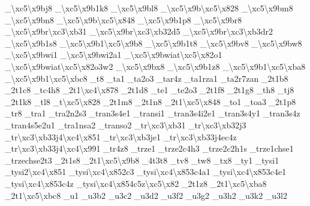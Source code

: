 {\-\_\-\textbackslash{}xc5\textbackslash{}x9bj8 \-\_\textbackslash{}xc5\textbackslash{}x9b1k8 \-\_\-\textbackslash{}xc5\textbackslash{}x9bl8 \-\_\-\textbackslash{}xc5\textbackslash{}x9b\textbackslash{}xc5\textbackslash{}x828 \-\_\-\textbackslash{}xc5\textbackslash{}x9bm8 \-\_\-\textbackslash{}xc5\textbackslash{}x9bn8 \-\_\-\textbackslash{}xc5\textbackslash{}x9b\textbackslash{}xc5\textbackslash{}x848 \-\_\textbackslash{}xc5\textbackslash{}x9b1p8 \-\_\-\textbackslash{}xc5\textbackslash{}x9br8 \-\_\-\textbackslash{}xc5\textbackslash{}x9br\textbackslash{}xc3\textbackslash{}xb31 \-\_\-\textbackslash{}xc5\textbackslash{}x9br\textbackslash{}xc3\textbackslash{}xb32d5 \-\_\-\textbackslash{}xc5\textbackslash{}x9br\textbackslash{}xc3\textbackslash{}xb3dr2 \-\_\textbackslash{}xc5\textbackslash{}x9b1s8 \-\_\textbackslash{}xc5\textbackslash{}x9b1\textbackslash{}xc5\textbackslash{}x9b8 \-\_\textbackslash{}xc5\textbackslash{}x9b1t8 \-\_\-\textbackslash{}xc5\textbackslash{}x9bv8 \-\_\-\textbackslash{}xc5\textbackslash{}x9bw8 \-\_\-\textbackslash{}xc5\textbackslash{}x9bwi1 \-\_\-\textbackslash{}xc5\textbackslash{}x9bwi2a1 \-\_\-\textbackslash{}xc5\textbackslash{}x9bwiat\textbackslash{}xc5\textbackslash{}x82o1 \-\_\-\textbackslash{}xc5\textbackslash{}x9bwiat\textbackslash{}xc5\textbackslash{}x82o3w2 \-\_\-\textbackslash{}xc5\textbackslash{}x9bx8 \-\_\textbackslash{}xc5\textbackslash{}x9b1z8 \-\_\textbackslash{}xc5\textbackslash{}x9b1\textbackslash{}xc5\textbackslash{}xba8 \-\_\textbackslash{}xc5\textbackslash{}x9b1\textbackslash{}xc5\textbackslash{}xbc8 \-\_\-t8 \-\_\-ta1 \-\_\-ta2o3 \-\_\-tar4z \-\_\-ta1rza1 \-\_\-ta2r7zan \-\_\-2t1b8 \-\_\-2t1c8 \-\_\-tc4h8 \-\_\-2t1\textbackslash{}xc4\textbackslash{}x878 \-\_\-2t1d8 \-\_\-te1 \-\_\-te2o3 \-\_\-2t1f8 \-\_\-2t1g8 \-\_\-th8 \-\_\-tj8 \-\_\-2t1k8 \-\_\-tl8 \-\_\-t\textbackslash{}xc5\textbackslash{}x828 \-\_\-2t1m8 \-\_\-2t1n8 \-\_\-2t1\textbackslash{}xc5\textbackslash{}x848 \-\_\-to1 \-\_\-toa3 \-\_\-2t1p8 \-\_\-tr8 \-\_\-tra1 \-\_\-tra2n2s3 \-\_\-tran3s4e1 \-\_\-transi1 \-\_\-tran3s4i2e1 \-\_\-tran3s4y1 \-\_\-tran3s4z \-\_\-tran4s5e2u1 \-\_\-tra1nsa2 \-\_\-transo2 \-\_\-tr\textbackslash{}xc3\textbackslash{}xb31 \-\_\-tr\textbackslash{}xc3\textbackslash{}xb32j3 \-\_\-tr\textbackslash{}xc3\textbackslash{}xb33j4\textbackslash{}xc4\textbackslash{}x851 \-\_\-tr\textbackslash{}xc3\textbackslash{}xb3je1 \-\_\-tr\textbackslash{}xc3\textbackslash{}xb33j4ec4z \-\_\-tr\textbackslash{}xc3\textbackslash{}xb33j4\textbackslash{}xc4\textbackslash{}x991 \-\_\-tr4z8 \-\_\-trze1 \-\_\-trze2c4h3 \-\_\-trze2c2h1s \-\_\-trze1chse1 \-\_\-trzechse2t3 \-\_\-2t1s8 \-\_\-2t1\textbackslash{}xc5\textbackslash{}x9b8 \-\_\-4t3t8 \-\_\-tv8 \-\_\-tw8 \-\_\-tx8 \-\_\-ty1 \-\_\-tysi1 \-\_\-tysi2\textbackslash{}xc4\textbackslash{}x851 \-\_\-tysi\textbackslash{}xc4\textbackslash{}x852c3 \-\_\-tysi\textbackslash{}xc4\textbackslash{}x853c4a1 \-\_\-tysi\textbackslash{}xc4\textbackslash{}x853c4e1 \-\_\-tysi\textbackslash{}xc4\textbackslash{}x853c4z \-\_\-tysi\textbackslash{}xc4\textbackslash{}x854c5z\textbackslash{}xc5\textbackslash{}x82 \-\_\-2t1z8 \-\_\-2t1\textbackslash{}xc5\textbackslash{}xba8 \-\_\-2t1\textbackslash{}xc5\textbackslash{}xbc8 \-\_\-u1 \-\_\-u3b2 \-\_\-u3c2 \-\_\-u3d2 \-\_\-u3f2 \-\_\-u3g2 \-\_\-u3h2 \-\_\-u3k2 \-\_\-u3l2 }
